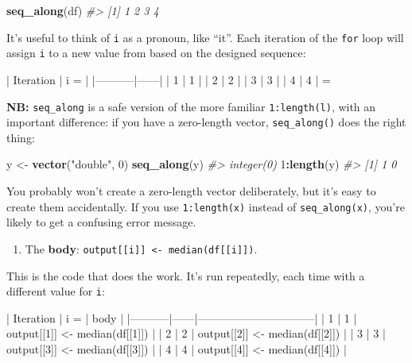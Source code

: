 \documentclass[]{book}
\newenvironment{Shaded}{\begin{snugshade}}{\end{snugshade}}
\newcommand{\KeywordTok}[1]{\textcolor[rgb]{0.13,0.29,0.53}{\textbf{#1}}}
\newcommand{\DecValTok}[1]{\textcolor[rgb]{0.00,0.00,0.81}{#1}}
\newcommand{\StringTok}[1]{\textcolor[rgb]{0.31,0.60,0.02}{#1}}
\newcommand{\CommentTok}[1]{\textcolor[rgb]{0.56,0.35,0.01}{\textit{#1}}}
\newcommand{\OperatorTok}[1]{\textcolor[rgb]{0.81,0.36,0.00}{\textbf{#1}}}
\newcommand{\NormalTok}[1]{#1}
\providecommand{\tightlist}{%
  \setlength{\itemsep}{0pt}\setlength{\parskip}{0pt}}
\begin{document}
\begin{Shaded}
\begin{Highlighting}[]
\KeywordTok{seq_along}\NormalTok{(df)}
\CommentTok{#> [1] 1 2 3 4}
\end{Highlighting}
\end{Shaded}

It's useful to think of \texttt{i} as a pronoun, like ``it''. Each
iteration of the \texttt{for} loop will assign \texttt{i} to a new value
from based on the designed sequence:

\begin{Shaded}
\begin{Highlighting}[]
\NormalTok{| Iteration | i =  |}
\NormalTok{|-----------|------|}
\NormalTok{| 1         | 1    | }
\NormalTok{| 2         | 2    | }
\NormalTok{| 3         | 3    | }
\NormalTok{| 4         | 4    | }
\NormalTok{=}
\end{Highlighting}
\end{Shaded}

\textbf{NB:} \texttt{seq\_along} is a safe version of the more familiar
\texttt{1:length(l)}, with an important difference: if you have a
zero-length vector, \texttt{seq\_along()} does the right thing:

\begin{Shaded}
\begin{Highlighting}[]
\NormalTok{y <-}\StringTok{ }\KeywordTok{vector}\NormalTok{(}\StringTok{"double"}\NormalTok{, }\DecValTok{0}\NormalTok{)}
\KeywordTok{seq_along}\NormalTok{(y)}
\CommentTok{#> integer(0)}
\DecValTok{1}\OperatorTok{:}\KeywordTok{length}\NormalTok{(y)}
\CommentTok{#> [1] 1 0}
\end{Highlighting}
\end{Shaded}

You probably won't create a zero-length vector deliberately, but it's
easy to create them accidentally. If you use \texttt{1:length(x)}
instead of \texttt{seq\_along(x)}, you're likely to get a confusing
error message.

\begin{enumerate}
\def\labelenumi{\arabic{enumi}.}
\setcounter{enumi}{2}
\tightlist
\item
  The \textbf{body}:
  \texttt{output{[}{[}i{]}{]}\ \textless{}-\ median(df{[}{[}i{]}{]})}.
\end{enumerate}

This is the code that does the work. It's run repeatedly, each time with
a different value for \texttt{i}:

\begin{Shaded}
\begin{Highlighting}[]
\NormalTok{| Iteration | i =  | body                           |}
\NormalTok{|-----------|------|--------------------------------|}
\NormalTok{| 1         | 1    | output[[1]] <- median(df[[1]]) |}
\NormalTok{| 2         | 2    | output[[2]] <- median(df[[2]]) |}
\NormalTok{| 3         | 3    | output[[3]] <- median(df[[3]]) |}
\NormalTok{| 4         | 4    | output[[4]] <- median(df[[4]]) |}
\end{Highlighting}
\end{Shaded}
\end{document}
